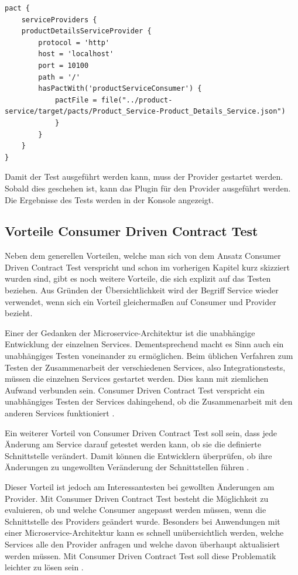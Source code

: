 \documentclass{llncs}
\begin{document}
\lstset{language = Java}
\begin{lstlisting}[caption=Einstellungen für das Testen vom Provider,label=lst:pluginProvider]
pact {
    serviceProviders {
    productDetailsServiceProvider {
        protocol = 'http'
        host = 'localhost'
        port = 10100
        path = '/'
        hasPactWith('productServiceConsumer') {
            pactFile = file("../product-service/target/pacts/Product_Service-Product_Details_Service.json")
			}
		}
	}
}
\end{lstlisting}

Damit der Test ausgeführt werden kann, muss der Provider gestartet werden. Sobald dies geschehen ist, kann das Plugin für den Provider ausgeführt werden. Die Ergebnisse des Tests werden in der Konsole angezeigt.
\subsection{Vorteile Consumer Driven Contract Test}
Neben dem generellen Vorteilen, welche man sich von dem Ansatz Consumer Driven Contract Test verspricht und schon im vorherigen Kapitel kurz skizziert wurden sind, gibt es noch weitere Vorteile, die sich explizit auf das Testen beziehen. Aus Gründen der Übersichtlichkeit wird der Begriff Service wieder verwendet, wenn sich ein Vorteil gleichermaßen auf Consumer und Provider bezieht.

Einer der Gedanken der Microservice-Architektur ist die unabhängige Entwicklung der einzelnen Services. Dementsprechend macht es Sinn auch ein unabhängiges Testen voneinander zu ermöglichen. Beim üblichen Verfahren zum Testen der Zusammenarbeit der verschiedenen Services, also Integrationstests, müssen die einzelnen Services gestartet werden. Dies kann mit ziemlichen Aufwand verbunden sein. Consumer Driven Contract Test verspricht ein unabhängiges Testen der Services dahingehend, ob die Zusammenarbeit mit den anderen Services funktioniert \cite{Vincent2015, bayer2015jaxcenter}. 

Ein weiterer Vorteil von Consumer Driven Contract Test soll sein, dass jede Änderung am Service darauf getestet werden kann, ob sie die definierte Schnittstelle verändert. Damit können die Entwicklern überprüfen, ob ihre Änderungen zu ungewollten Veränderung der Schnittstellen führen \cite{bayer2015jaxcenter}.

Dieser Vorteil ist jedoch am Interessantesten bei gewollten Änderungen am Provider. Mit Consumer Driven Contract Test besteht die Möglichkeit zu evaluieren, ob und welche Consumer angepasst werden müssen, wenn die Schnittstelle des Providers geändert wurde. Besonders bei Anwendungen mit einer Microservice-Architektur kann es schnell unübersichtlich werden, welche Services alle den Provider anfragen und welche davon überhaupt aktualisiert werden müssen. Mit Consumer Driven Contract Test soll diese Problematik leichter zu lösen sein \cite{vitz2016inno, Vincent2015}.
\end{document}
